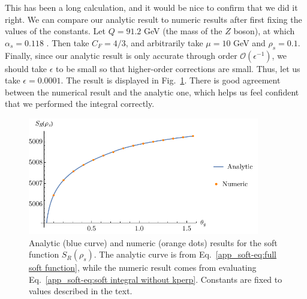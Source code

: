 \documentclass[../thesis.tex]{subfiles}
\providecommand{\cO}{\mathcal{O}}
\begin{document}
	This has been a long calculation, and it would be nice to confirm that we did it right. We can compare our analytic result to numeric results after first fixing the values of the constants. Let $Q = 91.2$ \si{\giga\electronvolt} (the mass of the $Z$ boson), at which $\alpha_s = 0.118$ \cite{particle_data_group_review_2020}. Then take $C_F = 4/3$, and arbitrarily take $\mu = 10$ \si{\giga\electronvolt} and $\rho_s = 0.1$. Finally, since our analytic result is only accurate through order $\cO(\epsilon^{-1})$, we should take $\epsilon$ to be small so that higher-order corrections are small. Thus, let us take $\epsilon = 0.0001$. The result is displayed in Fig.~\ref{app_soft-fig:soft function numerics}. There is good agreement between the numerical result and the analytic one, which helps us feel confident that we performed the integral correctly.
	\begin{figure}
	\begin{center}
		\includegraphics[width=0.9\textwidth]{figures/full_eps_0.0001.pdf}

		\caption{\label{app_soft-fig:soft function numerics}Analytic (blue curve) and numeric (orange dots) results for the soft function $S_R(\rho_s)$. The analytic curve is from Eq.~\ref{app_soft-eq:full soft function}, while the numeric result comes from evaluating Eq.~\ref{app_soft-eq:soft integral without kperp}. Constants are fixed to values described in the text.}
	\end{center}
	\end{figure}
\end{document}

